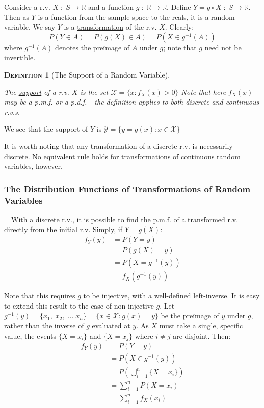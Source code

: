 \documentclass[12pt,a4paper]{article}
\newtheorem{definition}{\textsc{Definition}}[section]
\begin{document}
Consider a r.v. $X \; : \; S\rightarrow\mathbb{R}$ and a function $g\; : \; \mathbb{R}\rightarrow\mathbb{R}$. Define $Y = g \circ X \; : \; S\rightarrow\mathbb{R}$. Then as $Y$ is a function from the sample space to the reals, it is a random variable. We say $Y$ is a \underline{transformation} of the r.v. $X$. Clearly:
$$P(Y \in A) = P(g(X) \in A) = P(X \in g^{-1}(A))$$
\noindent where $g^{-1}(A)$ denotes the pre\"image of $A$ under $g$; note that $g$ need not be invertible.

\begin{definition}[The Support of a Random Variable]$\;$\par
\vspace{1cm}

The \underline{support} of a r.v. $X$ is the set $\mathcal{X} = \{x : f_X(x) > 0\}$ Note that here $f_X(x)$ may be a p.m.f. or a p.d.f. - the definition applies to both discrete and continuous r.v.s.
\end{definition}

\noindent We see that the support of $Y$ is $\mathcal{Y} = \{y = g(x) : x \in \mathcal{X}\}$\par
\vspace{1cm}
\indent It is worth noting that any transformation of a discrete r.v. is necessarily discrete. No equivalent rule holds for transformations of continuous random variables, however.

\subsubsection{The Distribution Functions of Transformations of Random Variables}

$\quad$With a discrete r.v., it is possible to find the p.m.f. of a transformed r.v. directly from the initial r.v. Simply, if $Y = g(X)$:
\begin{align*}
f_Y(y) &= P(Y = y)\\
&= P(g(X) = y)\\
&= P\left(X = g^{-1}(y)\right)\\
&= f_X(g^{-1}(y))
\end{align*}

Note that this requires $g$ to be injective, with a well-defined left-inverse. It is easy to extend this result to the case of non-injective $g$. Let $g^{-1}(y) = \{x_1, \; x_2, \; ... \; x_n\} = \{x \in \mathcal{X} : g(x) = y\}$ be the pre\"image of $y$ under $g$, rather than the inverse of $g$ evaluated at $y$. As $X$ must take a single, specific value, the events $\{X = x_i\}$ and $\{X = x_j\}$ where $i \neq j$ are disjoint. Then:
\begin{align*}
f_Y(y) &= P(Y = y)\\
&= P\left(X \in g^{-1}(y)\right)\\
&= P\left(\bigcup_{i = 1}^n \{X = x_i\}\right)\\
&= \sum_{i = 1}^n P(X = x_i)\\
& = \sum_{i=1}^n f_X(x_i)
\end{align*}
\end{document}
